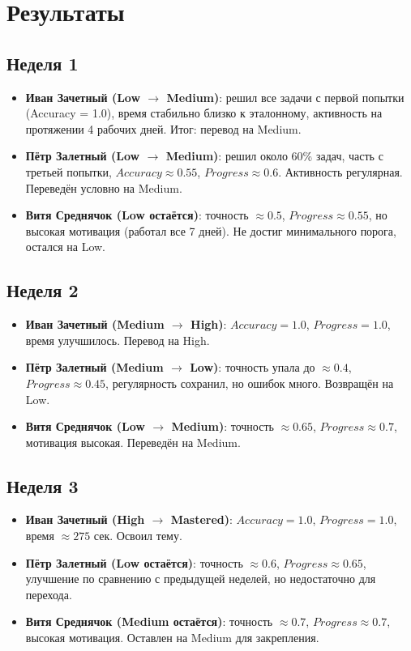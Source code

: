 \documentclass[12pt,a4paper]{article}
\begin{document}
\section{Результаты}

\subsection{Неделя 1}
\begin{itemize}
    \item \textbf{Иван Зачетный (Low $\rightarrow$ Medium)}: 
    решил все задачи с первой попытки (Accuracy = 1.0), время стабильно близко к эталонному, активность на протяжении 4 рабочих дней. Итог: перевод на Medium.
    \item \textbf{Пётр Залетный (Low $\rightarrow$ Medium)}: 
    решил около 60\% задач, часть с третьей попытки, $Accuracy \approx 0.55$, $Progress \approx 0.6$. Активность регулярная. Переведён условно на Medium.
    \item \textbf{Витя Среднячок (Low остаётся)}: 
    точность $\approx 0.5$, $Progress \approx 0.55$, но высокая мотивация (работал все 7 дней). Не достиг минимального порога, остался на Low.
\end{itemize}

\subsection{Неделя 2}
\begin{itemize}
    \item \textbf{Иван Зачетный (Medium $\rightarrow$ High)}: 
    $Accuracy = 1.0$, $Progress = 1.0$, время улучшилось. Перевод на High.
    \item \textbf{Пётр Залетный (Medium $\rightarrow$ Low)}: 
    точность упала до $\approx 0.4$, $Progress \approx 0.45$, регулярность сохранил, но ошибок много. Возвращён на Low.
    \item \textbf{Витя Среднячок (Low $\rightarrow$ Medium)}: 
    точность $\approx 0.65$, $Progress \approx 0.7$, мотивация высокая. Переведён на Medium.
\end{itemize}

\subsection{Неделя 3}
\begin{itemize}
    \item \textbf{Иван Зачетный (High $\rightarrow$ Mastered)}: 
    $Accuracy = 1.0$, $Progress = 1.0$, время $\approx 275$ сек. Освоил тему.
    \item \textbf{Пётр Залетный (Low остаётся)}: 
    точность $\approx 0.6$, $Progress \approx 0.65$, улучшение по сравнению с предыдущей неделей, но недостаточно для перехода.
    \item \textbf{Витя Среднячок (Medium остаётся)}: 
    точность $\approx 0.7$, $Progress \approx 0.7$, высокая мотивация. Оставлен на Medium для закрепления.
\end{itemize}
\end{document}
